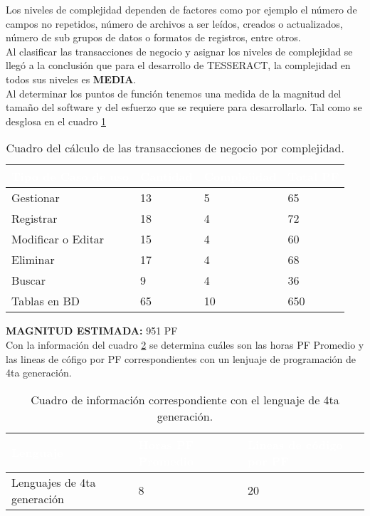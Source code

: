 Los niveles de complejidad dependen de factores como por ejemplo el número de campos no repetidos, número de archivos a ser leídos, creados o actualizados, número de sub grupos de datos o formatos de registros, entre otros.\\

Al clasificar las transacciones de negocio y asignar los niveles de complejidad se llegó a la conclusión que para el desarrollo de TESSERACT, la complejidad en todos sus niveles es \textbf {MEDIA}.\\

Al determinar los puntos de función tenemos una medida de la magnitud del tamaño del software y del esfuerzo que se requiere para desarrollarlo. Tal como se desglosa en el cuadro \ref{tbl:complejidad}

\begin{table}[H]
	\centering
	\begin{tabular}{|p{4cm}|p{3cm}|p{3cm}|p{3cm}|}
		\hline
		\rowcolor{black} \textcolor{white} {\textbf{Tipo de Caso de uso}} & \textcolor{white}{\textbf{Cantidad}} & \textcolor{white}{\textbf{Complejidad}} & \textcolor{white}{\textbf{Total PF}} \\ 
		\hline
		Gestionar & 13  &  5 &  65  \\
		\hline
		Registrar & 18 &  4 &  72 \\
		\hline
		Modificar o Editar & 15 &  4 &  60  \\
		\hline
		Eliminar & 17 &  4 &  68  \\
		\hline
		Buscar & 9 &  4 &  36 \\
		\hline
		Tablas en BD & 65 &  10 &  650 \\
		\hline
	\end{tabular}
\caption{Cuadro del cálculo de las transacciones de negocio por complejidad.}
\label{tbl:complejidad}
\end{table}

\textbf {MAGNITUD ESTIMADA:} 951 PF\\

Con la información del cuadro \ref{tbl:leng} se determina cuáles son las horas PF Promedio y las lineas de cófigo por PF correspondientes con un lenjuaje de programación de 4ta generación.\\

\begin{table}[H]
	\centering
	\begin{tabular}{|p{5cm}|p{3cm}|p{3cm}|}
		\hline
		\rowcolor{black} \textcolor{white} {\textbf{Lenguaje}} & \textcolor{white}{\textbf{Horas PF Promedio}} & \textcolor{white}{\textbf{Lineas de código por PF}} \\ \hline
		Lenguajes de 4ta generación & 8  & 20 \\
		\hline
	\end{tabular}
\caption{Cuadro de información correspondiente con el lenguaje de 4ta generación.}
\label{tbl:leng}
\end{table}

